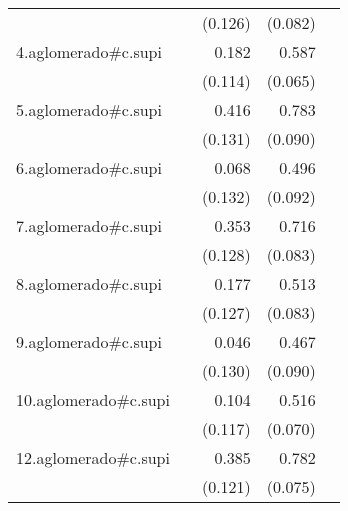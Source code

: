 {\begin{longtable}{l*{4}{D{.}{.}{-1}}}
            &                     &     (0.126)         &     (0.082)         &                     \\
\addlinespace
4.aglomerado#c.supi&                     &       0.182         &       0.587\sym{***}&                     \\
            &                     &     (0.114)         &     (0.065)         &                     \\
\addlinespace
5.aglomerado#c.supi&                     &       0.416\sym{**} &       0.783\sym{***}&                     \\
            &                     &     (0.131)         &     (0.090)         &                     \\
\addlinespace
6.aglomerado#c.supi&                     &       0.068         &       0.496\sym{***}&                     \\
            &                     &     (0.132)         &     (0.092)         &                     \\
\addlinespace
7.aglomerado#c.supi&                     &       0.353\sym{**} &       0.716\sym{***}&                     \\
            &                     &     (0.128)         &     (0.083)         &                     \\
\addlinespace
8.aglomerado#c.supi&                     &       0.177         &       0.513\sym{***}&                     \\
            &                     &     (0.127)         &     (0.083)         &                     \\
\addlinespace
9.aglomerado#c.supi&                     &       0.046         &       0.467\sym{***}&                     \\
            &                     &     (0.130)         &     (0.090)         &                     \\
\addlinespace
10.aglomerado#c.supi&                     &       0.104         &       0.516\sym{***}&                     \\
            &                     &     (0.117)         &     (0.070)         &                     \\
\addlinespace
12.aglomerado#c.supi&                     &       0.385\sym{**} &       0.782\sym{***}&                     \\
            &                     &     (0.121)         &     (0.075)         &                     \\

\end{longtable}}
